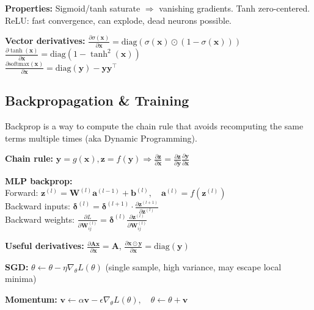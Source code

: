 \textbf{Properties:} Sigmoid/tanh saturate $\Rightarrow$ vanishing gradients. Tanh zero-centered. ReLU: fast convergence, can explode, dead neurons possible.

\textbf{Vector derivatives:}
$\frac{\partial \sigma(\mathbf{x})}{\partial \mathbf{x}} = \text{diag}(\sigma(\mathbf{x}) \odot (1 - \sigma(\mathbf{x})))$\\
$\frac{\partial \tanh(\mathbf{x})}{\partial \mathbf{x}} = \text{diag}(1 - \tanh^2(\mathbf{x}))$\\
$\frac{\partial \text{softmax}(\mathbf{x})}{\partial \mathbf{x}} = \text{diag}(\mathbf{y}) - \mathbf{y}\mathbf{y}^\top$

\subsection{Backpropagation \& Training}

Backprop is a way to compute the chain rule that avoids recomputing the same terms multiple times (aka Dynamic Programming).

\textbf{Chain rule:} $\mathbf{y} = g(\mathbf{x}), \mathbf{z} = f(\mathbf{y}) \Rightarrow \frac{\partial \mathbf{z}}{\partial \mathbf{x}} = \frac{\partial \mathbf{z}}{\partial \mathbf{y}} \frac{\partial \mathbf{y}}{\partial \mathbf{x}}$

\textbf{MLP backprop:}\\
Forward: $\mathbf{z}^{(l)} = \mathbf{W}^{(l)} \mathbf{a}^{(l-1)} + \mathbf{b}^{(l)}, \quad \mathbf{a}^{(l)} = f(\mathbf{z}^{(l)})$\\
Backward inputs: $\boldsymbol{\delta}^{(l)} = \boldsymbol{\delta}^{(l+1)} \cdot \frac{\partial \mathbf{z}^{(l+1)}}{\partial \mathbf{z}^{(l)}}$\\
Backward weights: $\frac{\partial L}{\partial \mathbf{W}_{ij}^{(l)}} = \boldsymbol{\delta}^{(l)} \frac{\partial \mathbf{z}^{(l)}}{\partial \mathbf{W}_{ij}^{(l)}}$

\textbf{Useful derivatives:} $\frac{\partial \mathbf{A}\mathbf{x}}{\partial \mathbf{x}} = \mathbf{A}$, $\frac{\partial \mathbf{x} \odot \mathbf{y}}{\partial \mathbf{x}} = \text{diag}(\mathbf{y})$



\textbf{SGD:} $\theta \leftarrow \theta - \eta \nabla_\theta L(\theta)$ (single sample, high variance, may escape local minima)

\textbf{Momentum:} $\mathbf{v} \leftarrow \alpha \mathbf{v} - \epsilon \nabla_\theta L(\theta), \quad \theta \leftarrow \theta + \mathbf{v}$


